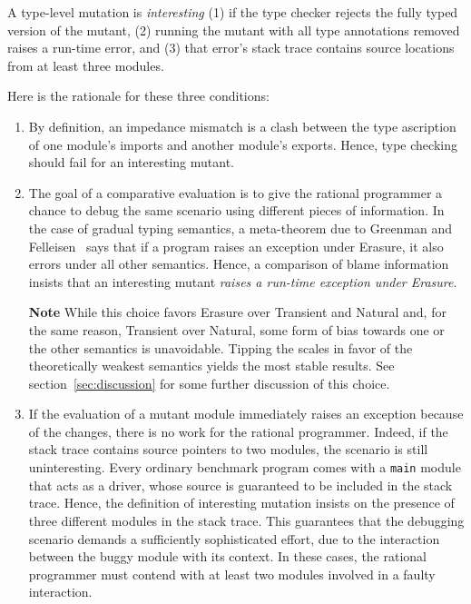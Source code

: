 
A type-level mutation is {\em interesting\/} (1) if the type checker rejects the fully typed version of the mutant,
(2) running the mutant with all type annotations removed raises a run-time error, and
(3) that error's stack trace contains source locations from at least three modules.

Here is the rationale for these three conditions:
\begin{enumerate}

\item By definition, an impedance mismatch is a clash between the type ascription of one module's imports and another module's exports. Hence, type checking should fail for an interesting mutant.


\item The goal of a comparative evaluation is to give the rational programmer a
chance to debug the same scenario using different pieces of information.  In the
case of gradual typing semantics, a meta-theorem due to Greenman and
Felleisen~\cite{gf-icfp-2018} says that if a program raises an exception under
Erasure, it also errors under all other semantics.  Hence, a comparison of blame
information insists that an interesting mutant {\em raises a run-time exception
under Erasure\/}.

{\bf Note} While this choice favors Erasure over Transient and Natural and, for
the same reason, Transient over Natural, some form of bias towards one or the
other semantics is unavoidable. Tipping the scales in favor of the theoretically
weakest semantics yields the most stable results. See
section~\ref{sec:discussion} for some further discussion of this choice.


\item If the evaluation of a mutant module immediately raises an exception because
of the changes, there is no work for the rational programmer. Indeed, if the
stack trace contains source pointers to two modules, the scenario is still
uninteresting. Every ordinary benchmark program comes with a {\tt main} module
that acts as a driver, whose source is guaranteed to be included in the stack
trace.  Hence, the definition of interesting mutation insists on the presence of
three different modules in the stack trace. This guarantees that the debugging
scenario demands a sufficiently sophisticated effort, due to the interaction
between the buggy module with its context.  In these cases, the rational
programmer must contend with at least two modules involved in a faulty
interaction.

\end{enumerate}

